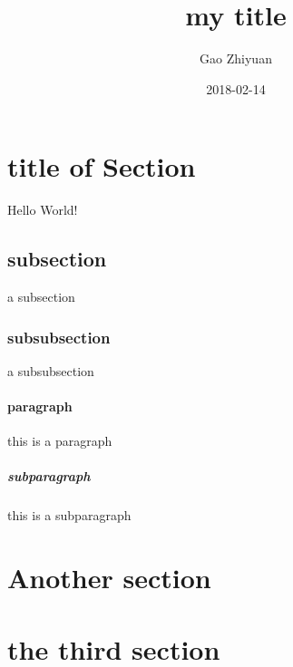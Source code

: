 \documentclass{article}
\title{my title}
\date{2018-02-14}
\author{Gao Zhiyuan}
\begin{document}
  \maketitle
  \newpage

  \section{title of Section}
  Hello World!
  \subsection{subsection}
  a subsection
  \subsubsection{subsubsection}
  a subsubsection 
  \paragraph{paragraph}
  this is a paragraph
  \subparagraph{subparagraph}
  this is a subparagraph

  \section{Another section}
  \section{the third section}
\end{document}
